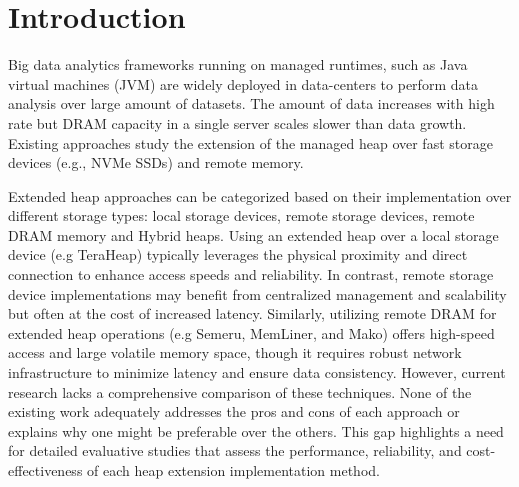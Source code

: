 \section{Introduction}

Big data analytics frameworks running on managed runtimes, such as Java virtual
machines (JVM) are widely deployed in data-centers to perform data analysis over
large amount of datasets. The amount of data increases with high rate but DRAM
capacity in a single server scales slower than data growth. Existing approaches
study the extension of the managed heap over fast storage devices (e.g., NVMe
SSDs) and remote memory.

Extended heap approaches can be categorized based on their implementation over different storage types: local storage devices, remote storage devices, remote DRAM memory and Hybrid heaps. Using an extended heap over a local storage device (e.g TeraHeap) typically  leverages the physical proximity and direct connection to enhance access speeds and reliability. In contrast, remote storage device implementations may benefit from centralized management and scalability but often at the cost of increased latency. Similarly, utilizing remote DRAM for extended heap operations (e.g Semeru, MemLiner, and Mako) offers high-speed access and large volatile memory space, though it requires robust network infrastructure to minimize latency and ensure data consistency. However, current research lacks a comprehensive comparison of these techniques. None of the existing work adequately addresses the pros and cons of each approach or explains why one might be preferable over the others. This gap highlights a need for detailed evaluative studies that assess the performance, reliability, and cost-effectiveness of each heap extension implementation method.


